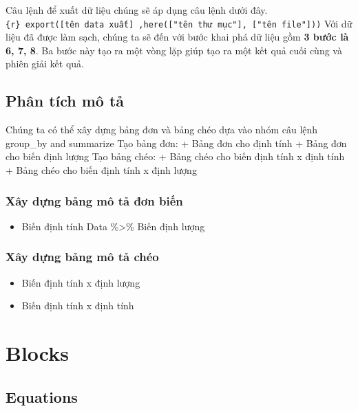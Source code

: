 \documentclass[
]{book}
\providecommand{\tightlist}{%
  \setlength{\itemsep}{0pt}\setlength{\parskip}{0pt}}
\theoremstyle{definition}
\theoremstyle{definition}
\theoremstyle{definition}
\theoremstyle{definition}
\theoremstyle{remark}
\begin{document}
Câu lệnh để xuất dữ liệu chúng sẽ áp dụng câu lệnh dưới đây. \texttt{\{r\}\ export({[}tên\ data\ xuất{]}\ ,here({[}"tên\ thư\ mục"{]},\ {[}"tên\ file"{]}))} Với dữ liệu đã được làm sạch, chúng ta sẽ đến với bước khai phá dữ liệu gồm \textbf{3 bước là 6, 7, 8}. Ba bước này tạo ra một vòng lặp giúp tạo ra một kết quả cuối cùng và phiên giải kết quả.

\hypertarget{phuxe2n-tuxedch-muxf4-tux1ea3}{%
\section{Phân tích mô tả}\label{phuxe2n-tuxedch-muxf4-tux1ea3}}

Chúng ta có thể xây dựng bảng đơn và bảng chéo dựa vào nhóm câu lệnh group\_by and summarize Tạo bảng đơn: + Bảng đơn cho định tính + Bảng đơn cho biến định lượng Tạo bảng chéo: + Bảng chéo cho biến định tính x định tính + Bảng chéo cho biến định tính x định lượng

\hypertarget{xuxe2y-dux1ef1ng-bux1ea3ng-muxf4-tux1ea3-ux111ux1a1n-biux1ebfn}{%
\subsection{Xây dựng bảng mô tả đơn biến}\label{xuxe2y-dux1ef1ng-bux1ea3ng-muxf4-tux1ea3-ux111ux1a1n-biux1ebfn}}

\begin{itemize}
\tightlist
\item
  Biến định tính Data \%\textgreater\% Biến định lượng
\end{itemize}

\hypertarget{xuxe2y-dux1ef1ng-bux1ea3ng-muxf4-tux1ea3-chuxe9o}{%
\subsection{Xây dựng bảng mô tả chéo}\label{xuxe2y-dux1ef1ng-bux1ea3ng-muxf4-tux1ea3-chuxe9o}}

\begin{itemize}
\item
  Biến định tính x định lượng
\item
  Biến định tính x định tính
\end{itemize}

\hypertarget{blocks}{%
\chapter{Blocks}\label{blocks}}

\hypertarget{equations}{%
\section{Equations}\label{equations}}
\end{document}
